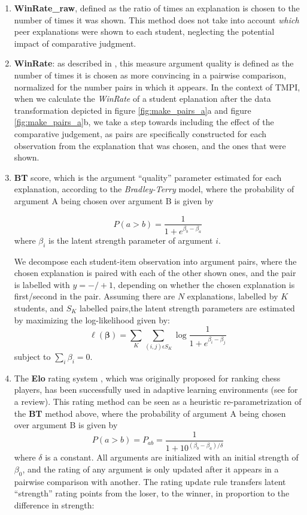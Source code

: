 \documentclass[notitlepage,12pt]{jedm}
\begin{document}
\begin{enumerate}
	
	\item \textbf{WinRate\_raw}, defined as the ratio of times an explanation 
	is 
	chosen to the number of times it was shown.
	This method does not take into account \textit{which} peer explanations 
	were shown to each student, neglecting the potential impact of comparative 
	judgment.
	
	\item \textbf{WinRate}: as described in \cite{potash_ranking_2019}, this 
	measure argument quality is defined as the number of times it is chosen as 
	more convincing in a pairwise comparison, normalized for the number pairs 
	in which it appears. 
	In the context of TMPI, when we calculate the \textit{WinRate} of a student 
	eplanation after the data transformation depicted in figure 
	\ref{fig:make_pairs_a}a and figure \ref{fig:make_pairs_a}b, we take a step 
	towards including the effect of the comparative judgement, as pairs are 
	specifically constructed for each observation from the explanation that was 
	chosen, and the ones that were shown.
	
	\item \textbf{BT} score, which is the argument ``quality'' parameter 
	estimated for each explanation, according to the \textit{Bradley-Terry} 
	model, where the probability of argument A being chosen over argument B is 
	given by 
	
	$$
	P(a>b) = 
	\frac{1}{1+e^{\beta_b-\beta_a}}
	$$
	where $\beta_i$ is the latent strength parameter of argument $i$. 
	
	We decompose each student-item observation into argument pairs, where the 
	chosen explanation is paired with each of the other shown ones, and the 
	pair is labelled with $y=-/+1$, depending on whether the chosen explanation 
	is first/second in the pair.
	Assuming there are $N$ explanations, labelled by $K$ students, and $S_K$ 
	labelled pairs,the latent strength parameters are estimated by maximizing 
	the log-likelihood given by:
	$$
	\ell(\boldsymbol{\beta})=\sum_{K}\sum_{(i,j)\epsilon S_K}^{} 
	\log\frac{1}{1+e^{\beta_i - \beta_j}}
	$$
	subject to $\sum_{i}\beta_i=0$.
	
	
	\item The \textbf{Elo} rating system \cite{elo_rating_1978}, which was 
	originally proposed for ranking chess players, has been successfully used 
	in adaptive learning environments (see \cite{pelanek_applications_2016} for 
	a review). 
	This rating method can be seen as a heuristic re-parametrization of the 
	\textbf{BT} method above, where the probability of argument A being chosen 
	over argument B is given by
	$$
	P(a>b) = P_{ab} = \frac{1}{1+10^{(\beta_b-\beta_a)/\delta}}
	$$
	where $\delta$ is a constant. 
	All arguments are initialized with an initial strength of $\beta_0$, and 
	the rating of any argument is only updated after it appears in a pairwise 
	comparison with another.
	The rating update rule transfers latent ``strength'' rating points from the 
	loser, to the 
	winner, in proportion to the difference in strength:
	

\end{enumerate}
\end{document}
